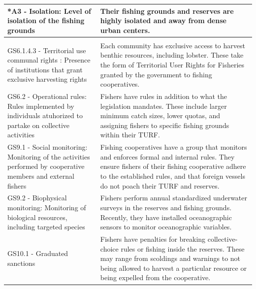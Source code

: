 \documentclass{frontiersSCNS}
\begin{document}
\begin{table}[H]
{\begin{tabular}[t]{>{\raggedright\arraybackslash}p{6.5cm}|>{\raggedright\arraybackslash}p{12cm}}
\hline
\hspace{1em}*A3 - Isolation: Level of isolation of the fishing grounds & Their fishing grounds and reserves are highly isolated and away from dense urban centers.\\
\hline
\multicolumn{2}{l}{\textbf{Governance system (G)}}\\
\hline
\hspace{1em}GS6.1.4.3 - Territorial use communal rights : Presence of institutions that grant exclusive harvesting rights & Each community has exclusive access to harvest benthic resources, including lobster. These take the form of Territorial User Rights for Fisheries granted by the government to fishing cooperatives.\\
\hline
\hspace{1em}GS6.2 - Operational rules: Rules implemented by individuals atuhorized to partake on collective activities & Fishers have rules in addition to what the legislation mandates. These include larger minimum catch sizes, lower quotas, and assigning fishers to specific fishing grounds within their TURF.\\
\hline
\hspace{1em}GS9.1 - Social monitoring: Monitoring of the activities performed by cooperative members and external fishers & Fishing cooperatives have a group that monitors and enforces formal and internal rules. They ensure fishers of their fishing cooperative adhere to the established rules, and that foreign vessels do not poach their TURF and reserves.\\
\hline
\hspace{1em}GS9.2 - Biophysical monitoring: Monitoring of biological resources, including targeted species & Fishers perform annual standardized underwater surveys in the reserves and fishing grounds. Recently, they have installed oceanographic sensors to monitor oceanographic variables.\\
\hline
GS10.1 - Graduated sanctions & Fishers have penalties for breaking collective-choice rules or fishing inside the reserves. These may range from scoldings and warnings to not being allowed to harvest a particular resource or being expelled from the cooperative.\\
\hline
\end{tabular}}
\end{table}
\end{document}
